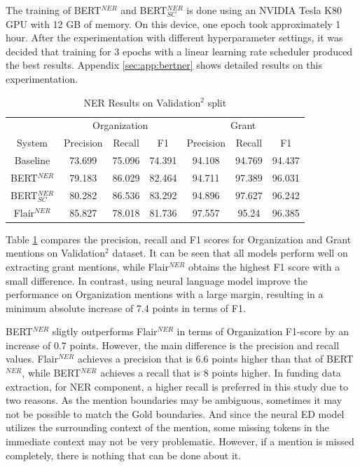 \documentclass{report}
\theoremstyle{definition}
\theoremstyle{remark}
\begin{document}
The training of BERT$^{NER}$ and BERT$^{NER}_{SC}$ is done using an NVIDIA Tesla K80 GPU with 12 GB of memory. On this device, one epoch took approximately 1 hour. After the experimentation with different hyperparameter settings, it was decided that training for 3 epochs with a linear learning rate scheduler produced the best results. Appendix \ref{sec:app:bertner} shows detailed results on this experimentation.

\begin{table}[h!]
    \centering
    \begin{tabular}{c| c c c| c c c}
    &\multicolumn{3}{c|}{Organization}&\multicolumn{3}{c}{Grant} \\
    System&Precision&Recall&F1&Precision&Recall&F1\\
    \hline
    Baseline & 73.699&	75.096&74.391&94.108&94.769&94.437
 \\[0.7ex]
    BERT$^{NER}$ & 79.183&86.029&82.464&94.711&97.389&96.031
\\[0.7ex]
    BERT$^{NER}_{SC}$ & 80.282&86.536&83.292&94.896	&97.627&96.242
  \\[0.7ex]
    Flair$^{NER}$& 85.827&78.018&81.736&97.557&95.24&96.385
 \\[0.7ex]
    \end{tabular}
    \caption{NER Results on Validation$^2$ split}
    \label{tab:all_ner_results}
\end{table}

Table \ref{tab:all_ner_results} compares the precision, recall and F1 scores for Organization and Grant mentions on Validation$^2$ dataset. It can be seen that all models perform well on extracting grant mentions, while Flair$^{NER}$ obtains the highest F1 score with a small difference. In contrast, using neural language model improve the performance on Organization mentions with a large margin, resulting in a minimum absolute increase of 7.4 points in terms of F1.

BERT$^{NER}$ sligtly outperforms Flair$^{NER}$ in terms of Organization F1-score by an increase of 0.7 points. However, the main difference is the precision and recall values. Flair$^{NER}$ achieves a precision that is 6.6 points higher than that of BERT$^{NER}$, while BERT$^{NER}$ achieves a recall that is 8 points higher. In funding data extraction, for NER component, a higher recall is preferred in this study due to two reasons. As the mention boundaries may be ambiguous, sometimes it may not be possible to match the Gold boundaries. And since the neural ED model utilizes the surrounding context of the mention, some missing tokens in the immediate context may not be very problematic. However, if a mention is missed completely, there is nothing that can be done about it.
\end{document}
